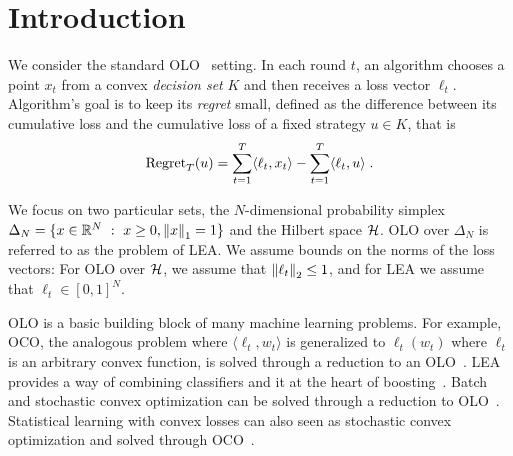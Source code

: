 \section{Introduction}
\label{section:introduction}

We consider the standard \ac{OLO}~\citep{Cesa-Bianchi-Lugosi-2006,
Shalev-Shwartz-2011} setting. In each round $t$, an algorithm chooses a point
$x_t$ from a convex \emph{decision set} $K$ and then receives a loss vector
$\ell_t$. Algorithm's goal is to keep its \emph{regret} small, defined as the
difference between its cumulative loss and the cumulative loss of a fixed
strategy $u \in K$, that is
$$
\operatorname{Regret}_T(u) = \sum_{t=1}^T \langle \ell_t, x_t \rangle - \sum_{t=1}^T \langle \ell_t, u \rangle \; .
$$

We focus on two particular sets, the $N$-dimensional probability simplex
$\Delta_N = \{ x \in \mathbb{R}^N ~:~ x \ge 0, \left\|{x}\right\|_1 = 1\}$ and the Hilbert space
$\mathcal{H}$.  \ac{OLO} over $\Delta_N$ is referred to as the problem of \ac{LEA}.  We
assume bounds on the norms of the loss vectors: For \ac{OLO} over $\mathcal{H}$, we
assume that $\left\|{\ell_t}\right\|_2 \le 1$, and for \ac{LEA} we assume that
$\ell_t \in [0,1]^N$.

\ac{OLO} is a basic building block of many machine learning problems. For
example, \ac{OCO}, the analogous problem where $\langle \ell_t, w_t \rangle$ is
generalized to $\ell_t(w_t)$ where $\ell_t$ is an arbitrary convex function, is
solved through a reduction to an \ac{OLO}~\citep{Shalev-Shwartz-2011}.
\ac{LEA}~\citep{Littlestone-Warmuth-1994, Vovk-1998,
Cesa-Bianchi-Freund-Haussler-Helmbold-Schapire-Warmuth-1997} provides a way of
combining classifiers and it at the heart of
boosting~\cite{Freund-Schapire-1997}. Batch and stochastic convex optimization
can be solved through a reduction to \ac{OLO}~\citep{Shalev-Shwartz-2011}.
Statistical learning with convex losses can also seen as stochastic convex
optimization and solved through \ac{OCO}~\citep{Munro-1951}.

